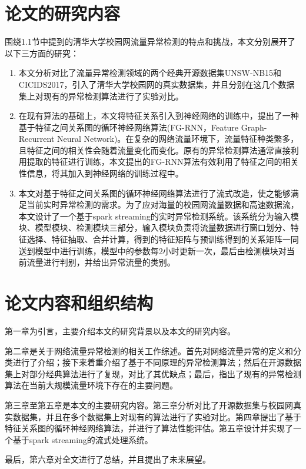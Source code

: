 \section{论文的研究内容}
围绕1.1节中提到的清华大学校园网流量异常检测的特点和挑战，本文分别展开了以下三方面的研究：
\begin{enumerate}
  \item 本文分析对比了流量异常检测领域的两个经典开源数据集UNSW-NB15和CICIDS2017，引入了清华大学校园网的真实数据集，并且分别在这几个数据集上对现有的异常检测算法进行了实验对比。
    \item 在现有算法的基础上，本文将特征关系引入到神经网络的训练中，提出了一种基于特征之间关系图的循环神经网络算法(FG-RNN，Feature Graph-Recurrent Neural Network)。在复杂的网络流量环境下，流量特征种类繁多，且特征之间的相关性会随着流量变化而变化。原有的异常检测算法通常直接利用提取的特征进行训练，本文提出的FG-RNN算法有效利用了特征之间的相关性信息，将其加入到神经网络的训练过程中。
    \item 本文对基于特征之间关系图的循环神经网络算法进行了流式改造，使之能够满足当前实时异常检测的需求。为了应对海量的校园网流量数据和高速数据流，本文设计了一个基于spark streaming的实时异常检测系统。该系统分为输入模块、模型模块、检测模块三部分，输入模块负责将流量数据进行窗口划分、特征选择、特征抽取、合并计算，得到的特征矩阵与预训练得到的关系矩阵一同送到模型中进行训练，模型中的参数每2小时更新一次，最后由检测模块对当前流量进行判别，并给出异常流量的类别。

\end{enumerate}

\section{论文内容和组织结构}
第一章为引言，主要介绍本文的研究背景以及本文的研究内容。

第二章是关于网络流量异常检测的相关工作综述。首先对网络流量异常的定义和分类进行了介绍；接下来着重介绍了基于不同原理的异常检测算法；然后在开源数据集上对部分经典算法进行了复现，对比了其优缺点；最后，指出了现有的异常检测算法在当前大规模流量环境下存在的主要问题。

第三章至第五章是本文的主要研究内容。第三章分析对比了开源数据集与校园网真实数据集，并且在多个数据集上对现有的算法进行了实验对比。第四章提出了基于特征关系图的循环神经网络算法，并进行了算法性能评估。第五章设计并实现了一个基于spark streaming的流式处理系统。

最后，第六章对全文进行了总结，并且提出了未来展望。
